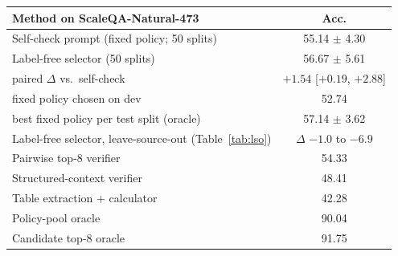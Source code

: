 \begin{tabular}{lc}
\toprule
Method on ScaleQA-Natural-473 & Acc. \\
\midrule
Self-check prompt (fixed policy; 50 splits) & 55.14 $\pm$ 4.30 \\
Label-free selector (50 splits) & 56.67 $\pm$ 5.61 \\
\quad paired $\Delta$ vs.\ self-check & $+1.54$ [$+0.19$, $+2.88$] \\
\quad fixed policy chosen on dev & 52.74 \\
\quad best fixed policy per test split (oracle) & 57.14 $\pm$ 3.62 \\
Label-free selector, leave-source-out (Table~\ref{tab:lso}) & $\Delta$ $-1.0$ to $-6.9$ \\
Pairwise top-8 verifier & 54.33 \\
Structured-context verifier & 48.41 \\
Table extraction + calculator & 42.28 \\
\midrule
Policy-pool oracle & 90.04 \\
Candidate top-8 oracle & 91.75 \\
\bottomrule
\end{tabular}
